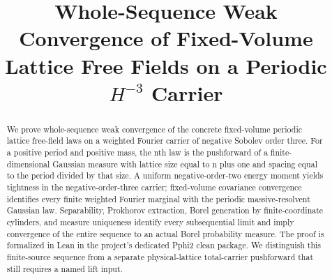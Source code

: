 \documentclass[11pt]{amsart}
\title[Fixed-volume weak convergence]{Whole-Sequence Weak Convergence of Fixed-Volume Lattice Free Fields on a Periodic $H^{-3}$ Carrier}
\date{}
\theoremstyle{remark}
\begin{document}
\begin{abstract}
We prove whole-sequence weak convergence of the concrete fixed-volume periodic lattice free-field laws on a weighted Fourier carrier of negative Sobolev order three. For a positive period and positive mass, the nth law is the pushforward of a finite-dimensional Gaussian measure with lattice size equal to n plus one and spacing equal to the period divided by that size. A uniform negative-order-two energy moment yields tightness in the negative-order-three carrier; fixed-volume covariance convergence identifies every finite weighted Fourier marginal with the periodic massive-resolvent Gaussian law. Separability, Prokhorov extraction, Borel generation by finite-coordinate cylinders, and measure uniqueness identify every subsequential limit and imply convergence of the entire sequence to an actual Borel probability measure. The proof is formalized in Lean in the project's dedicated Pphi2 clean package. We distinguish this finite-source sequence from a separate physical-lattice total-carrier pushforward that still requires a named lift input.
\end{abstract}
\maketitle







\appendix


\end{document}

